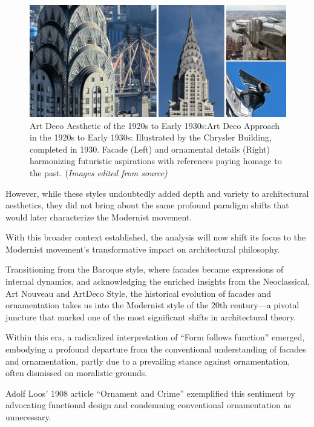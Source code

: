      \begin{figure}[htb]
          \centering
          \includegraphics[width= \linewidth]{Images/ArtDecoFacade}
          \caption{Art Deco Aesthetic of the 1920s to Early 1930s:Art Deco Approach in the 1920s to Early 1930s:  Illustrated by the Chrysler Building, completed in 1930. Facade (Left) and ornamental details (Right) harmonizing futuristic aspirations with references paying homage to the past. (\textit{Images edited from source)}}
          \label{fig:NeoclassicArtDeco}
        \end{figure}

However, while these styles undoubtedly added depth and variety to architectural aesthetics, they did not bring about the same profound paradigm shifts that would later characterize the Modernist movement.

With this broader context established, the analysis will now shift its focus to the Modernist movement's transformative impact on architectural philosophy.


Transitioning from the Baroque style, where facades became expressions of internal dynamics, and acknowledging the enriched insights from the Neoclassical, Art Nouveau and ArtDeco Style,  the historical evolution of facades and ornamentation takes us into the Modernist style of the 20th century—a pivotal juncture that marked one of the most significant shifts in architectural theory.

 Within this era, a radicalized interpretation of ``Form follows function'' emerged, embodying a profound departure from the conventional understanding of facades and ornamentation, partly due to a prevailing stance against ornamentation, often dismissed on moralistic grounds.

Adolf Loos' 1908 article ``Ornament and Crime'' exemplified this sentiment by advocating functional design and condemning conventional ornamentation as unnecessary\cite{Saglam2014}.

